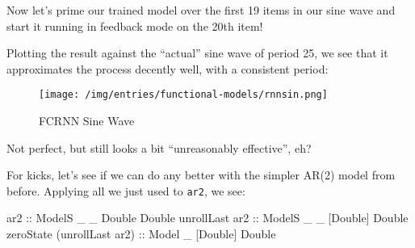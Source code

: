 \documentclass[]{article}
\newenvironment{Shaded}{}{}
\newcommand{\CommentTok}[1]{\textcolor[rgb]{0.38,0.63,0.69}{\textit{#1}}}
\newcommand{\DataTypeTok}[1]{\textcolor[rgb]{0.56,0.13,0.00}{#1}}
\newcommand{\DecValTok}[1]{\textcolor[rgb]{0.25,0.63,0.44}{#1}}
\newcommand{\FloatTok}[1]{\textcolor[rgb]{0.25,0.63,0.44}{#1}}
\newcommand{\FunctionTok}[1]{\textcolor[rgb]{0.02,0.16,0.49}{#1}}
\newcommand{\KeywordTok}[1]{\textcolor[rgb]{0.00,0.44,0.13}{\textbf{#1}}}
\newcommand{\NormalTok}[1]{#1}
\newcommand{\OtherTok}[1]{\textcolor[rgb]{0.00,0.44,0.13}{#1}}
\begin{document}
Now let's prime our trained model over the first 19 items in our sine wave and
start it running in feedback mode on the 20th item!

\begin{Shaded}
\end{Shaded}

Plotting the result against the ``actual'' sine wave of period 25, we see that
it approximates the process decently well, with a consistent period:

\begin{figure}
\centering
\texttt{[image: /img/entries/functional-models/rnnsin.png]}
\caption{FCRNN Sine Wave}
\end{figure}

Not perfect, but still looks a bit ``unreasonably effective'', eh?

For kicks, let's see if we can do any better with the simpler AR(2) model from
before. Applying all we just used to \texttt{ar2}, we see:

\begin{Shaded}
\begin{Highlighting}[]
\OtherTok{ar2                        ::} \DataTypeTok{ModelS}\NormalTok{ _ _  }\DataTypeTok{Double}  \DataTypeTok{Double}
\NormalTok{unrollLast}\OtherTok{ ar2             ::} \DataTypeTok{ModelS}\NormalTok{ _ _ [}\DataTypeTok{Double}\NormalTok{] }\DataTypeTok{Double}
\NormalTok{zeroState (unrollLast ar2)}\OtherTok{ ::} \DataTypeTok{Model}\NormalTok{  _   [}\DataTypeTok{Double}\NormalTok{] }\DataTypeTok{Double}
\end{Highlighting}
\end{Shaded}
\end{document}
